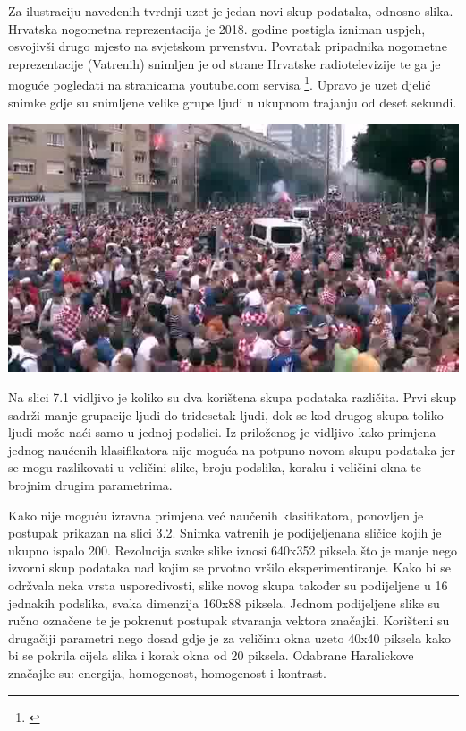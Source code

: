 \documentclass[times, utf8, zavrsni]{fer}
\begin{document}
\bigbreak

Za ilustraciju navedenih tvrdnji uzet je jedan novi skup podataka, odnosno slika. Hrvatska 
nogometna reprezentacija je 2018. godine postigla izniman uspjeh, osvojivši drugo mjesto
na svjetskom prvenstvu. Povratak pripadnika nogometne reprezentacije (Vatrenih) snimljen
je od strane Hrvatske radiotelevizije te ga je moguće pogledati na stranicama youtube.com
servisa \footnote{\cite{vatreni}}. Upravo je uzet djelić snimke gdje su snimljene 
velike grupe ljudi u ukupnom trajanju od deset sekundi.  

\bigbreak

\begin{minipage}{\linewidth}
\centering
\includegraphics[scale=0.5]{img/data2.jpg}
\end{minipage}

\bigbreak

Na slici 7.1 vidljivo je koliko su dva korištena skupa podataka različita. Prvi skup sadrži
manje grupacije ljudi do tridesetak ljudi, dok se kod drugog skupa toliko ljudi može naći
samo u jednoj podslici. Iz priloženog je vidljivo kako primjena jednog naućenih klasifikatora
nije moguća na potpuno novom skupu podataka jer se mogu razlikovati u veličini slike, 
broju podslika, koraku i veličini okna te brojnim drugim parametrima. 

\bigbreak 

Kako nije moguću izravna primjena već naučenih klasifikatora, ponovljen je postupak 
prikazan na slici 3.2. Snimka vatrenih je podijeljenana sličice kojih je ukupno ispalo 200. 
Rezolucija svake slike iznosi 640x352 piksela što je manje nego izvorni skup podataka 
nad kojim se prvotno vršilo eksperimentiranje. Kako bi se održvala neka vrsta usporedivosti,
 slike novog skupa također su podijeljene u 16 jednakih podslika, svaka dimenzija 160x88 piksela. 
Jednom podijeljene slike su ručno označene te je pokrenut postupak
stvaranja vektora značajki. Korišteni su drugačiji parametri nego dosad gdje je za
veličinu okna uzeto 40x40 piksela kako bi se pokrila cijela slika i korak okna od 20 piksela.
Odabrane Haralickove značajke su: energija, homogenost, homogenost i kontrast.
\end{document}
